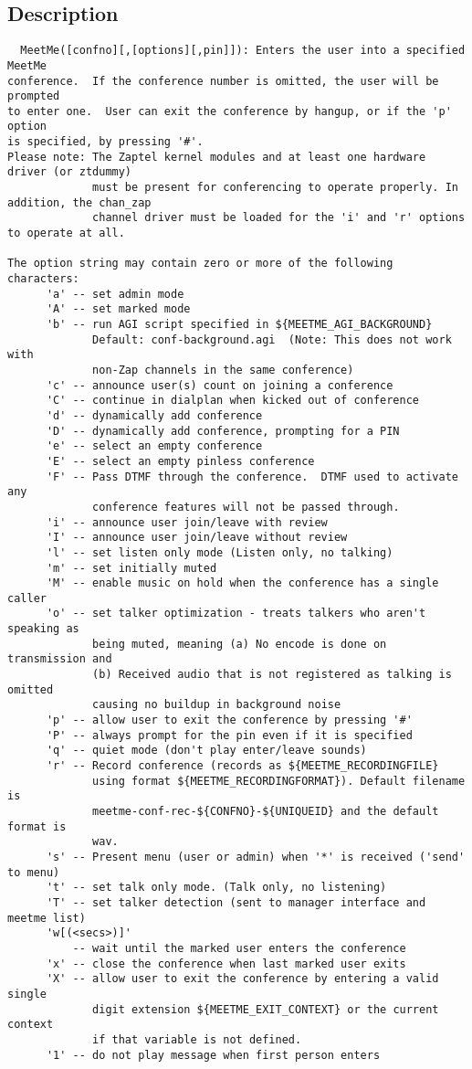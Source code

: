 \subsection{Description}
\begin{verbatim}
  MeetMe([confno][,[options][,pin]]): Enters the user into a specified MeetMe
conference.  If the conference number is omitted, the user will be prompted
to enter one.  User can exit the conference by hangup, or if the 'p' option
is specified, by pressing '#'.
Please note: The Zaptel kernel modules and at least one hardware driver (or ztdummy)
             must be present for conferencing to operate properly. In addition, the chan_zap
             channel driver must be loaded for the 'i' and 'r' options to operate at all.

The option string may contain zero or more of the following characters:
      'a' -- set admin mode
      'A' -- set marked mode
      'b' -- run AGI script specified in ${MEETME_AGI_BACKGROUND}
             Default: conf-background.agi  (Note: This does not work with
             non-Zap channels in the same conference)
      'c' -- announce user(s) count on joining a conference
      'C' -- continue in dialplan when kicked out of conference
      'd' -- dynamically add conference
      'D' -- dynamically add conference, prompting for a PIN
      'e' -- select an empty conference
      'E' -- select an empty pinless conference
      'F' -- Pass DTMF through the conference.  DTMF used to activate any
             conference features will not be passed through.
      'i' -- announce user join/leave with review
      'I' -- announce user join/leave without review
      'l' -- set listen only mode (Listen only, no talking)
      'm' -- set initially muted
      'M' -- enable music on hold when the conference has a single caller
      'o' -- set talker optimization - treats talkers who aren't speaking as
             being muted, meaning (a) No encode is done on transmission and
             (b) Received audio that is not registered as talking is omitted
             causing no buildup in background noise
      'p' -- allow user to exit the conference by pressing '#'
      'P' -- always prompt for the pin even if it is specified
      'q' -- quiet mode (don't play enter/leave sounds)
      'r' -- Record conference (records as ${MEETME_RECORDINGFILE}
             using format ${MEETME_RECORDINGFORMAT}). Default filename is
             meetme-conf-rec-${CONFNO}-${UNIQUEID} and the default format is
             wav.
      's' -- Present menu (user or admin) when '*' is received ('send' to menu)
      't' -- set talk only mode. (Talk only, no listening)
      'T' -- set talker detection (sent to manager interface and meetme list)
      'w[(<secs>)]'
          -- wait until the marked user enters the conference
      'x' -- close the conference when last marked user exits
      'X' -- allow user to exit the conference by entering a valid single
             digit extension ${MEETME_EXIT_CONTEXT} or the current context
             if that variable is not defined.
      '1' -- do not play message when first person enters

\end{verbatim}


